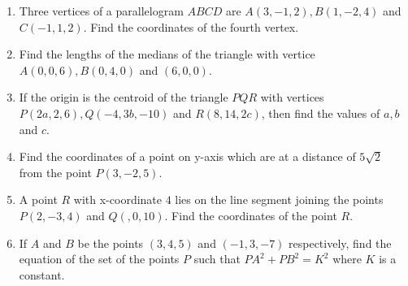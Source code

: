 \begin{enumerate}
\item Three vertices of a parallelogram $ABCD$ are $A(3,-1,2), B(1,-2,4)$ and $C(-1,1,2)$. Find the coordinates of the fourth vertex.
\item Find the lengths of the medians of the triangle with vertice $A(0,0,6), B(0,4,0)$ and $(6,0,0)$.
\item If the origin is the centroid of the triangle $PQR$ with vertices $P(2a,2,6), Q(-4,3b,-10)$ and $R(8,14,2c)$, then find the values of $a, b$ and $c$.
\item Find the coordinates of a point on y-axis which are at a distance of $5\sqrt2$ from the point $P(3,-2,5)$.
\item A point $R$ with x-coordinate $4$ lies on the line segment joining the points $P(2,-3,4)$ and $Q(,0,10)$. Find the coordinates of the point $R$.
\item If $A$ and $B$ be the points $(3,4,5)$ and $(-1,3,-7)$ respectively, find the equation of the set of the points $P$ such that $PA^2+PB^2=K^2$ where $K$ is a constant.
\end{enumerate}
  
